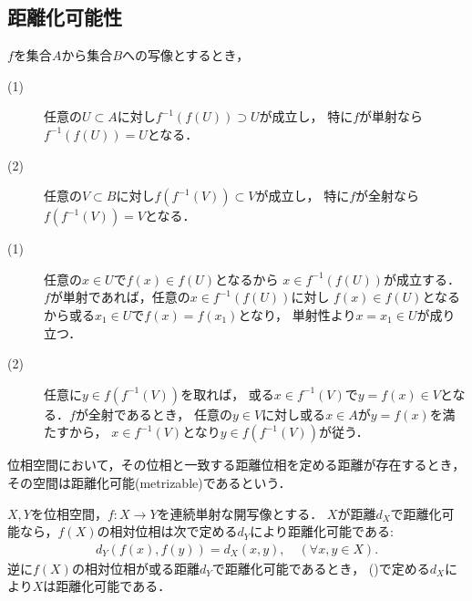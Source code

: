 \subsection{距離化可能性}
	\begin{screen}
		\begin{thm}[全射・単射・像・原像]\label{projective_injective_image_preimage}
			$f$を集合$A$から集合$B$への写像とするとき，
			\begin{description}
				\item[(1)] 任意の$U \subset A$に対し$f^{-1}\left(f(U)\right) \supset U$が成立し，
					特に$f$が単射なら$f^{-1}\left(f(U)\right) = U$となる．
				\item[(2)] 任意の$V \subset B$に対し$f\left(f^{-1}(V)\right) \subset V$が成立し，
					特に$f$が全射なら$f\left(f^{-1}(V)\right) = V$となる．
			\end{description}
		\end{thm}
	\end{screen}
	
	\begin{prf}\mbox{}
		\begin{description}
			\item[(1)] 任意の$x \in U$で$f(x) \in f(U)$となるから
				$x \in f^{-1}\left(f(U)\right)$が成立する．
				$f$が単射であれば，任意の$x \in f^{-1}\left(f(U)\right)$に対し
				$f(x) \in f(U)$となるから或る$x_1 \in U$で$f(x) = f(x_1)$となり，
				単射性より$x = x_1 \in U$が成り立つ．
				
			\item[(2)] 任意に$y \in f\left(f^{-1}(V)\right)$を取れば，
				或る$x \in f^{-1}(V)$で$y = f(x) \in V$となる．$f$が全射であるとき，
				任意の$y \in V$に対し或る$x \in A$が$y = f(x)$を満たすから，
				$x \in f^{-1}(V)$となり$y \in f\left(f^{-1}(V)\right)$が従う．
				\QED
		\end{description}
	\end{prf}
	
	\begin{screen}
		\begin{dfn}[距離化可能]
			位相空間において，その位相と一致する距離位相を定める距離が存在するとき，
			その空間は距離化可能(metrizable)であるという．
		\end{dfn}
	\end{screen}
	
	\begin{screen}
		\begin{thm}[連続単射な開写像による距離化可能性の遺伝]\label{thm:heredity_of_metrizability}
			$X,Y$を位相空間，$f:X \longrightarrow Y$を連続単射な開写像とする．
			$X$が距離$d_X$で距離化可能なら，$f(X)$の相対位相は次で定める$d_Y$により距離化可能である:
			\begin{align}
				d_Y\left(f(x),f(y)\right) = d_X(x,y),
				\quad (\forall x,y \in X).
				\label{eq:thm_heredity_of_metrizability}
			\end{align}
			逆に$f(X)$の相対位相が或る距離$d_Y$で距離化可能であるとき，
			()で定める$d_X$により$X$は距離化可能である．
		\end{thm}
	\end{screen}
	
